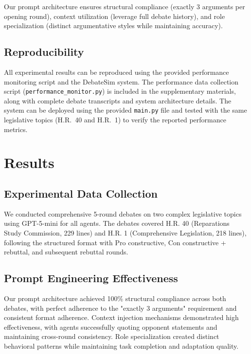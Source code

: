 \documentclass{article}
\begin{document}
Our prompt architecture ensures structural compliance (exactly 3 arguments per opening round), context utilization (leverage full debate history), and role specialization (distinct argumentative styles while maintaining accuracy).

\subsection{Reproducibility}

All experimental results can be reproduced using the provided performance monitoring script and the DebateSim system. The performance data collection script (\texttt{performance\_monitor.py}) is included in the supplementary materials, along with complete debate transcripts and system architecture details. The system can be deployed using the provided \texttt{main.py} file and tested with the same legislative topics (H.R.~40 and H.R.~1) to verify the reported performance metrics.

\section{Results}

\subsection{Experimental Data Collection}

We conducted comprehensive 5-round debates on two complex legislative topics using GPT-5-mini for all agents. The debates covered H.R. 40 (Reparations Study Commission, 229 lines) and H.R. 1 (Comprehensive Legislation, 218 lines), following the structured format with Pro constructive, Con constructive + rebuttal, and subsequent rebuttal rounds.

\subsection{Prompt Engineering Effectiveness}

Our prompt architecture achieved 100\% structural compliance across both debates, with perfect adherence to the "exactly 3 arguments" requirement and consistent format adherence. Context injection mechanisms demonstrated high effectiveness, with agents successfully quoting opponent statements and maintaining cross-round consistency. Role specialization created distinct behavioral patterns while maintaining task completion and adaptation quality.
\end{document}
